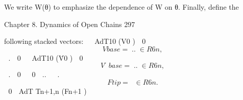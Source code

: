 \documentclass[12pt,a4paper]{article}
\begin{document}
We write W(θ) to emphasize the dependence of W on θ. Finally, define the


Chapter 8. Dynamics of Open Chains                                                                  297

following stacked vectors:
                                                  
                                       AdT10 (V0 )
                                          0       
                                                  
\begin{equation}
Vbase    =      ..       ∈ R6n ,
\label{eq:8.65}
\end{equation}
                                           .      
                                                  0
                                                   
                                       AdT10 (V̇0 )
                                          0        
                                                   
\begin{equation}
V̇base   =      ..        ∈ R6n ,
\label{eq:8.66}
\end{equation}
                                           .       
                                                  0
                                                                  
                                                      0
                                                     ..           
                                                      .           
\begin{equation}
Ftip    =                               ∈ R6n .
\label{eq:8.67}
\end{equation}
                                                     0            
                                             AdT
                                               Tn+1,n (Fn+1 )
\end{document}
